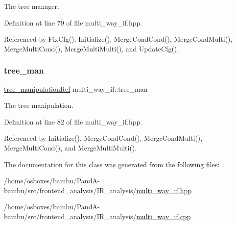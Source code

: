 The tree manager. 



Definition at line 79 of file multi\+\_\+way\+\_\+if.\+hpp.



Referenced by Fix\+Cfg(), Initialize(), Merge\+Cond\+Cond(), Merge\+Cond\+Multi(), Merge\+Multi\+Cond(), Merge\+Multi\+Multi(), and Update\+Cfg().

\mbox{\label{classmulti__way__if_afa70d2a92fc33d0ad311fc2fb1f0924a}} 
\subsubsection{\texorpdfstring{tree\+\_\+man}{tree\_man}}
{\footnotesize\ttfamily \hyperlink{tree__manipulation_8hpp_a1a9460e3a2f9fc6a96cfd2f24cc9b2a5}{tree\+\_\+manipulation\+Ref} multi\+\_\+way\+\_\+if\+::tree\+\_\+man\hspace{0.3cm}{\ttfamily [private]}}



The tree manipulation. 



Definition at line 82 of file multi\+\_\+way\+\_\+if.\+hpp.



Referenced by Initialize(), Merge\+Cond\+Cond(), Merge\+Cond\+Multi(), Merge\+Multi\+Cond(), and Merge\+Multi\+Multi().



The documentation for this class was generated from the following files\+:\begin{DoxyCompactItemize}
\item 
/home/osboxes/bambu/\+Pand\+A-\/bambu/src/frontend\+\_\+analysis/\+I\+R\+\_\+analysis/\hyperlink{multi__way__if_8hpp}{multi\+\_\+way\+\_\+if.\+hpp}\item 
/home/osboxes/bambu/\+Pand\+A-\/bambu/src/frontend\+\_\+analysis/\+I\+R\+\_\+analysis/\hyperlink{multi__way__if_8cpp}{multi\+\_\+way\+\_\+if.\+cpp}\end{DoxyCompactItemize}
